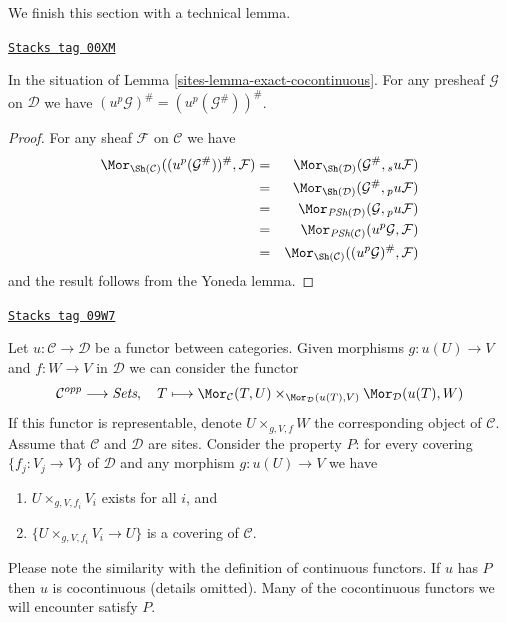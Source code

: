 We finish this section with a technical lemma.

\begin{lemma}[Technical pu]
\label{sites-lemma-technical-pu}
\href{https://stacks.math.columbia.edu/tag/00XM}{\texttt{Stacks tag 00XM}}

In the situation of Lemma \ref{sites-lemma-exact-cocontinuous}.
For any presheaf $\mathcal{G}$ on $\mathcal{D}$
we have $(u^p\mathcal{G})^\# = (u^p(\mathcal{G}^\#))^\#$.
\end{lemma}

\begin{proof}
For any sheaf $\mathcal{F}$ on $\mathcal{C}$ we have
\begin{eqnarray*}
\Mor_{\Sh(\mathcal{C})}((u^p(\mathcal{G}^\#))^\#, \mathcal{F})
& = &
\Mor_{\Sh(\mathcal{D})}(\mathcal{G}^\#, {}_su\mathcal{F}) \\
& = &
\Mor_{\Sh(\mathcal{D})}(\mathcal{G}^\#, {}_pu\mathcal{F}) \\
& = &
\Mor_{\textit{PSh}(\mathcal{D})}(\mathcal{G}, {}_pu\mathcal{F}) \\
& = &
\Mor_{\textit{PSh}(\mathcal{C})}(u^p\mathcal{G}, \mathcal{F}) \\
& = &
\Mor_{\Sh(\mathcal{C})}((u^p\mathcal{G})^\#, \mathcal{F})
\end{eqnarray*}
and the result follows from the Yoneda lemma.
\end{proof}

\begin{remark}
\label{sites-remark-cartesian-cocontinuous}
\href{https://stacks.math.columbia.edu/tag/09W7}{\texttt{Stacks tag 09W7}}

Let $u : \mathcal{C} \to \mathcal{D}$ be a functor between categories.
Given morphisms $g : u(U) \to V$ and $f : W \to V$ in $\mathcal{D}$
we can consider the functor
$$
\mathcal{C}^{opp} \longrightarrow \textit{Sets},\quad
T \longmapsto
\Mor_\mathcal{C}(T, U)
\times_{\Mor_\mathcal{D}(u(T), V)}
\Mor_\mathcal{D}(u(T), W)
$$
If this functor is representable, denote $U \times_{g, V, f} W$
the corresponding object of $\mathcal{C}$.
Assume that $\mathcal{C}$ and $\mathcal{D}$ are sites.
Consider the property $P$: for every covering $\{f_j : V_j \to V\}$
of $\mathcal{D}$ and any morphism $g : u(U) \to V$ we have
\begin{enumerate}
\item $U \times_{g, V, f_i} V_i$ exists for all $i$, and
\item $\{U \times_{g, V, f_i} V_i \to U\}$ is a covering of $\mathcal{C}$.
\end{enumerate}
Please note the similarity with the definition of continuous
functors. If $u$ has $P$ then $u$ is cocontinuous (details omitted).
Many of the cocontinuous functors we will encounter satisfy $P$.
\end{remark}

